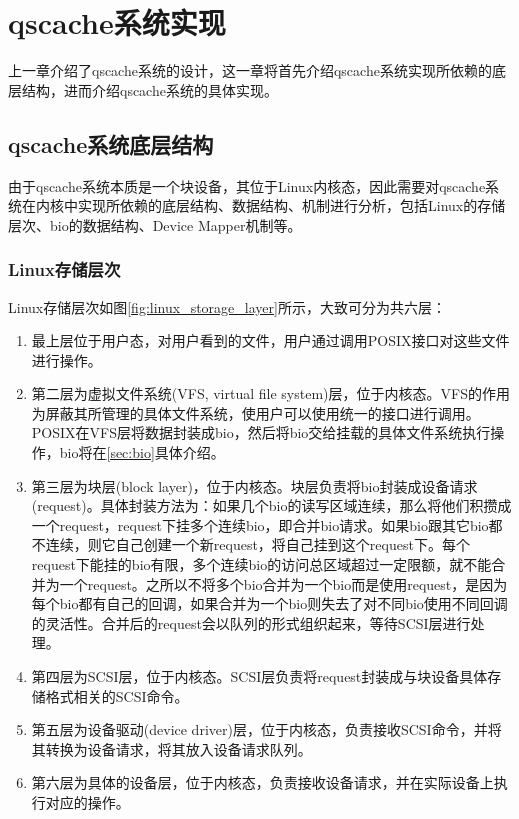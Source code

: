 
\chapter{qscache系统实现}
\label{chap:sys_implement}

上一章介绍了qscache系统的设计，这一章将首先介绍qscache系统实现所依赖的底层结构，进而介绍qscache系统的具体实现。

\section{qscache系统底层结构}

由于qscache系统本质是一个块设备，其位于Linux内核态，因此需要对qscache系统在内核中实现所依赖的底层结构、数据结构、机制进行分析，包括Linux的存储层次、bio的数据结构、Device Mapper机制等。

\subsection{Linux存储层次}

Linux存储层次如图\ref{fig:linux_storage_layer}所示，大致可分为共六层\cite{敖青云2011存储技术原理分析}：

\begin{enumerate}[leftmargin=0pt, itemindent=39pt]
    \item 最上层位于用户态，对用户看到的文件，用户通过调用POSIX接口对这些文件进行操作。

    \item 第二层为虚拟文件系统(VFS, virtual file system)层，位于内核态。VFS的作用为屏蔽其所管理的具体文件系统，使用户可以使用统一的接口进行调用。POSIX在VFS层将数据封装成bio，然后将bio交给挂载的具体文件系统执行操作，bio将在\ref{sec:bio}具体介绍。

    \item 第三层为块层(block layer)，位于内核态。块层负责将bio封装成设备请求(request)。具体封装方法为：如果几个bio的读写区域连续，那么将他们积攒成一个request，request下挂多个连续bio，即合并bio请求。如果bio跟其它bio都不连续，则它自己创建一个新request，将自己挂到这个request下。每个request下能挂的bio有限，多个连续bio的访问总区域超过一定限额，就不能合并为一个request。之所以不将多个bio合并为一个bio而是使用request，是因为每个bio都有自己的回调，如果合并为一个bio则失去了对不同bio使用不同回调的灵活性。合并后的request会以队列的形式组织起来，等待SCSI层进行处理。

    \item 第四层为SCSI层，位于内核态。SCSI层负责将request封装成与块设备具体存储格式相关的SCSI命令。

    \item 第五层为设备驱动(device driver)层，位于内核态，负责接收SCSI命令，并将其转换为设备请求，将其放入设备请求队列。

    \item 第六层为具体的设备层，位于内核态，负责接收设备请求，并在实际设备上执行对应的操作。

\end{enumerate}

